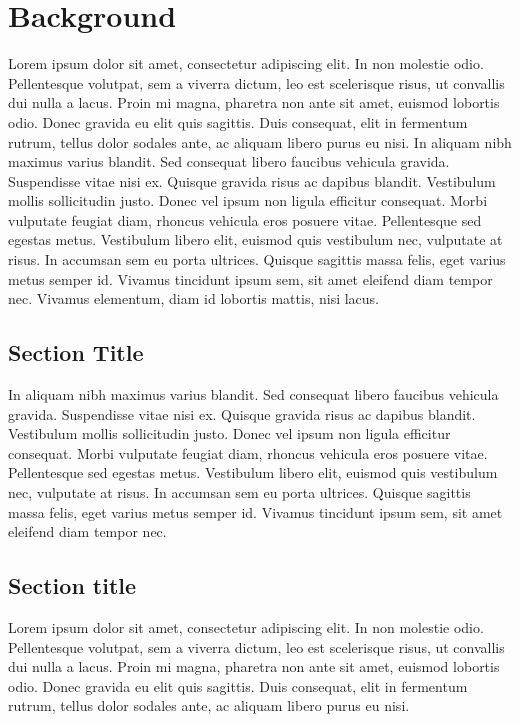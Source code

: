 \chapter{Background}

Lorem ipsum dolor sit amet, consectetur adipiscing elit. In non molestie odio. Pellentesque volutpat, sem a viverra dictum, leo est scelerisque risus, ut convallis dui nulla a lacus. Proin mi magna, pharetra non ante sit amet, euismod lobortis odio. Donec gravida eu elit quis sagittis. Duis consequat, elit in fermentum rutrum, tellus dolor sodales ante, ac aliquam libero purus eu nisi. In aliquam nibh maximus varius blandit. Sed consequat libero faucibus vehicula gravida. Suspendisse vitae nisi ex. Quisque gravida risus ac dapibus blandit. Vestibulum mollis sollicitudin justo. Donec vel ipsum non ligula efficitur consequat. Morbi vulputate feugiat diam, rhoncus vehicula eros posuere vitae. Pellentesque sed egestas metus. Vestibulum libero elit, euismod quis vestibulum nec, vulputate at risus. In accumsan sem eu porta ultrices. Quisque sagittis massa felis, eget varius metus semper id. Vivamus tincidunt ipsum sem, sit amet eleifend diam tempor nec. Vivamus elementum, diam id lobortis mattis, nisi lacus. 

\section{Section Title}
In aliquam nibh maximus varius blandit. Sed consequat libero faucibus vehicula gravida. Suspendisse vitae nisi ex. Quisque gravida risus ac dapibus blandit. Vestibulum mollis sollicitudin justo. Donec vel ipsum non ligula efficitur consequat. Morbi vulputate feugiat diam, rhoncus vehicula eros posuere vitae. Pellentesque sed egestas metus. Vestibulum libero elit, euismod quis vestibulum nec, vulputate at risus. In accumsan sem eu porta ultrices. Quisque sagittis massa felis, eget varius metus semper id. Vivamus tincidunt ipsum sem, sit amet eleifend diam tempor nec. 

\section{Section title}
Lorem ipsum dolor sit amet, consectetur adipiscing elit. In non molestie odio. Pellentesque volutpat, sem a viverra dictum, leo est scelerisque risus, ut convallis dui nulla a lacus.  Proin mi magna, pharetra non ante sit amet, euismod lobortis odio. Donec gravida eu elit quis sagittis. Duis consequat, elit in fermentum rutrum, tellus dolor sodales ante, ac aliquam libero purus eu nisi. 

